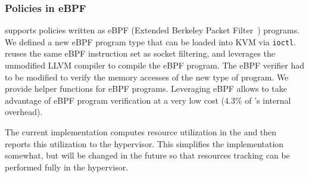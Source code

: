 \subsubsection{Policies in eBPF}
\label{s:bpf}

\Model supports policies written as eBPF (Extended Berkeley Packet Filter~\cite{bpf}) programs.
We defined a new eBPF program type
that can be loaded into KVM via \lstinline|ioctl|.
\model reuses the same eBPF instruction set as socket filtering,
and leverages the unmodified LLVM compiler to compile the eBPF program.
The eBPF verifier had to be modified to verify the memory accesses of the new type of program.
We provide helper functions for \model eBPF programs.
Leveraging eBPF allows \model to take advantage of eBPF program verification at a very low cost (4.3\% of \model's internal overhead).

The current implementation computes resource utilization in the \worker and then reports this utilization to the hypervisor.
This simplifies the implementation somewhat, but will be changed in the future so that resources tracking can be performed fully in the hypervisor.

